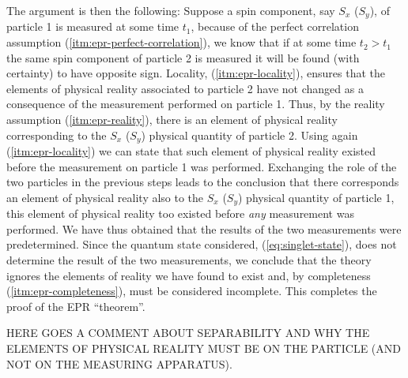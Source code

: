 The argument is then the following: Suppose a spin component, say $S_x$ ($S_y$), of particle 1 is measured at some time $t_1$, because of the perfect correlation assumption (\ref{itm:epr-perfect-correlation}), we know that if at some time $t_2 > t_1$ the same spin component of particle 2 is measured it will be found (with certainty) to have opposite sign. Locality, (\ref{itm:epr-locality}), ensures that the elements of physical reality associated to particle 2 have not changed as a consequence of the measurement performed on particle 1. Thus, by the reality assumption (\ref{itm:epr-reality}), there is an element of physical reality corresponding to the $S_x$ ($S_y$) physical quantity of particle 2. Using again (\ref{itm:epr-locality}) we can state that such element of physical reality existed before the measurement on particle 1 was performed. Exchanging the role of the two particles in the previous steps leads to the conclusion that there corresponds an element of physical reality also to the $S_x$ ($S_y$) physical quantity of particle 1, this element of physical reality too existed before \textit{any} measurement was performed. We have thus obtained that the results of the two measurements were predetermined. Since the quantum state considered, (\ref{eq:singlet-state}), does not determine the result of the two measurements, we conclude that the theory ignores the elements of reality we have found to exist and, by completeness (\ref{itm:epr-completeness}), must be considered incomplete. This completes the proof of the EPR ``theorem''.%

\begin{remark}
  HERE GOES A COMMENT ABOUT SEPARABILITY AND WHY THE ELEMENTS OF PHYSICAL REALITY MUST BE ON THE PARTICLE (AND NOT ON THE MEASURING APPARATUS). \cite{:/content/aapt/journal/ajp/69/6/10.1119/1.1356698}
\end{remark}

